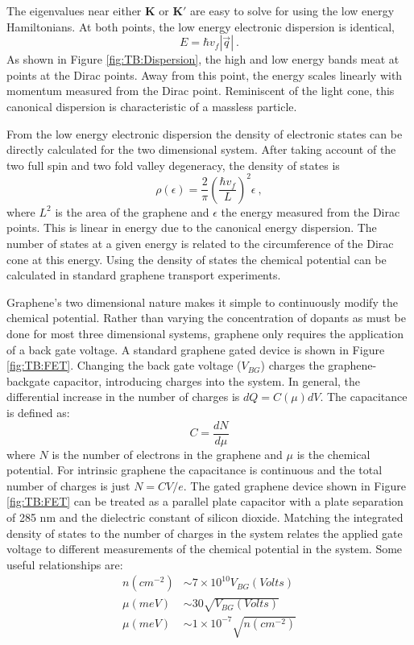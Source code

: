 The eigenvalues near either $\bm{K}$ or $\bm{K'}$ are easy to solve for using the low energy Hamiltonians.
At both points, the low energy electronic dispersion is identical,
\begin{equation*}
	E=\hbar v_f |\vec{q}| \ .
\end{equation*}
As shown in Figure \ref{fig:TB:Dispersion}, the high and low energy bands meat at points at the Dirac points.
Away from this point, the energy scales linearly with momentum measured from the Dirac point.
Reminiscent of the light cone, this canonical dispersion is characteristic of a massless particle.

From the low energy electronic dispersion the density of electronic states can be directly calculated for the two dimensional system.
After taking account of the two full spin and two fold valley degeneracy, the density of states is
\begin{equation}
	\rho(\epsilon)=\frac{2}{\pi} \left( \frac{\hbar v_f}{L} \right)^2 \epsilon \ ,
\end{equation}
where $L^2$ is the area of the graphene and $\epsilon$ the energy measured from the Dirac points.
This is linear in energy due to the canonical energy dispersion.
The number of states at a given energy is related to the circumference of the Dirac cone at this energy.
Using the density of states the chemical potential can be calculated in standard graphene transport experiments.

Graphene's two dimensional nature makes it simple to continuously modify the chemical potential.
Rather than varying the concentration of dopants as must be done for most three dimensional systems, graphene only requires the application of a back gate voltage.
A standard graphene gated device is shown in Figure \ref{fig:TB:FET}.
Changing the back gate voltage ($V_{BG}$) charges the graphene-backgate capacitor, introducing charges into the system.
In general, the differential increase in the number of charges is $dQ=C(\mu) dV$.
The capacitance is defined as:
\begin{equation}
	C=\frac{d N}{d \mu}
\end{equation}
where $N$ is the number of electrons in the graphene and $\mu$ is the chemical potential.
For intrinsic graphene the capacitance is continuous and the total number of charges is just $N=CV/e$.
The gated graphene device shown in Figure \ref{fig:TB:FET} can be treated as a parallel plate capacitor with a plate separation of 285 nm and the dielectric constant of silicon dioxide.
Matching the integrated density of states to the number of charges in the system relates the applied gate voltage to different measurements of the chemical potential in the system.
Some useful relationships are:
\begin{align*}
	n(cm^{-2})&\sim 7 \times 10^{10} V_{BG} (Volts) \\
	\mu(meV) &\sim 30 \sqrt{V_{BG} (Volts)} \\
	\mu(meV) &\sim 1 \times 10^{-7} \sqrt{n(cm^{-2})}
\end{align*}

